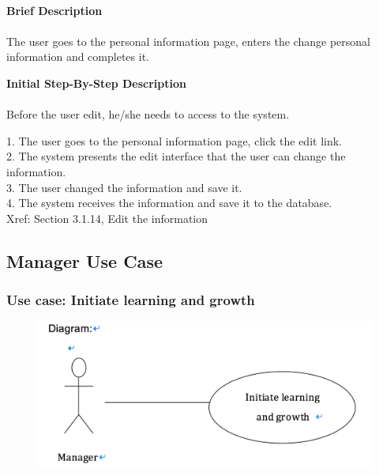 \documentclass[12pt]{report}
\begin{document}
\paragraph{}
\begin{flushleft}
\textbf{Brief Description }
\paragraph{}
The user goes to the personal information page, enters the change personal information and completes it.\\

\begin{flushleft}
\textbf{Initial Step-By-Step Description }
\paragraph{}
Before the user edit, he/she needs to access to the system.

\begin{flushleft}
1.	The user goes to the personal information page, click the edit link. \\
2.	The system presents the edit interface that the user can change the information. \\
3.	The user changed the information and save it. \\
4.	The system receives the information and save it to the database. \\
Xref: Section 3.1.14, Edit the information 
\end{flushleft}
\end{flushleft}
\end{flushleft}

\newpage
\subsection{Manager Use Case} 
\subsubsection{Use case:  Initiate learning and growth}

\begin{figure}[!htb]
  \includegraphics{21.PNG}
\end{figure}
\end{document}
